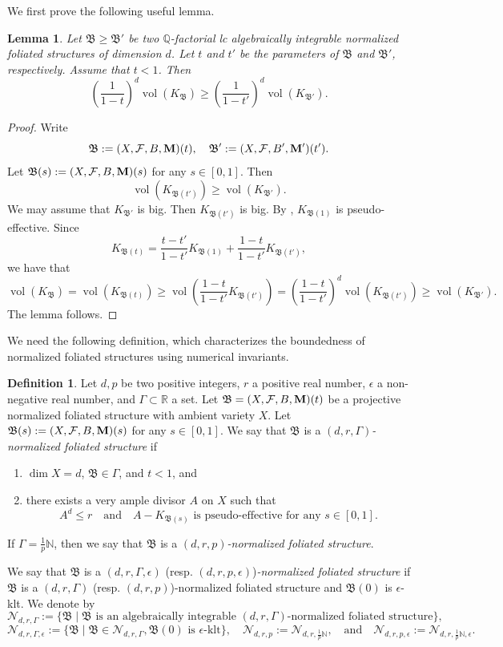 \documentclass[11pt,reqno]{amsart}
\numberwithin{equation}{section}
\newcommand{\Mm}{{\bf{M}}}
\newcommand{\vol}{\operatorname{vol}}
\newcommand{\Bb}{{\mathfrak{B}}}
\newcommand{\Ff}{\mathcal{F}}
\newcommand{\Ii}{\Gamma}
\newtheorem{lem}[thm]{Lemma}
\theoremstyle{definition}
\newtheorem{defn}[thm]{Definition}
\begin{document}
We first prove the following useful lemma.

\begin{lem}\label{lem: volume monotonicity}
    Let $\Bb\geq\Bb'$ be two $\mathbb Q$-factorial lc algebraically integrable normalized foliated structures of dimension $d$. Let $t$ and $t'$ be the parameters of $\Bb$ and $\Bb'$, respectively. Assume that $t<1$. Then 
    $$\left(\frac{1}{1-t}\right)^d\vol(K_{\Bb})\geq\left(\frac{1}{1-t'}\right)^d\vol(K_{\Bb'}).$$
\end{lem}
\begin{proof}
    Write 
    $$\Bb:=(X,\Ff,B,\Mm)(t),\quad \Bb':=(X,\Ff,B',\Mm')(t').$$
    Let $\Bb(s):=(X,\Ff,B,\Mm)(s)$ for any $s\in [0,1]$. Then
    $$\vol(K_{\Bb(t')})\geq\vol(K_{\Bb'}).$$
    We may assume that $K_{\Bb'}$ is big. Then $K_{\Bb(t')}$ is big. By \cite[Theorem~5.1]{Cas+25a}, $K_{\Bb(1)}$ is pseudo-effective. Since
    $$K_{\Bb(t)}=\frac{t-t'}{1-t'}K_{\Bb(1)}+\frac{1-t}{1-t'}K_{\Bb(t')},$$
    we have that
    $$\vol(K_{\Bb})=\vol(K_{\Bb(t)})\geq\vol\left(\frac{1-t}{1-t'}K_{\Bb(t')}\right)=\left(\frac{1-t}{1-t'}\right)^d\vol(K_{\Bb(t')})\geq\vol(K_{\Bb'}).$$
    The lemma follows.
\end{proof}

We need the following definition, which characterizes the boundedness of normalized foliated structures using numerical invariants.

\begin{defn}
Let $d,p$ be two positive integers, $r$ a positive real number, $\epsilon$ a non-negative real number, and $\Ii\subset\mathbb R$ a set. Let $\Bb=(X,\Ff,B,\Mm)(t)$ be a projective normalized foliated structure with ambient variety $X$. Let $\Bb(s):=(X,\Ff,B,\Mm)(s)$ for any $s\in [0,1]$. We say that $\Bb$ is a \emph{$(d,r,\Ii)$-normalized foliated structure} if
\begin{enumerate}
    \item $\dim X=d$, $\Bb\in\Ii$, and $t<1$, and
    \item there exists a very ample divisor $A$ on $X$ such that $$A^d\leq r \quad \text{and} \quad A-K_{\Bb(s)} \text{ is pseudo-effective for any }s\in [0,1].$$
\end{enumerate}
If $\Ii=\frac{1}{p}\mathbb N$, then we say that $\Bb$ is a \emph{$(d,r,p)$-normalized foliated structure}. 

We say that $\Bb$ is a \emph{$(d,r,\Ii,\epsilon)$} (resp. \emph{$(d,r,p,\epsilon)$})\emph{-normalized foliated structure} if $\Bb$ is a $(d,r,\Ii)$ (resp. $(d,r,p)$)-normalized foliated structure and $\Bb(0)$ is $\epsilon$-klt. We denote by 
$$\mathcal{N}_{d,r,\Ii}:=\{\Bb\mid \Bb\text{ is an algebraically integrable }(d,r,\Ii)\text{-normalized foliated structure}\},$$
$$\mathcal{N}_{d,r,\Ii,\epsilon}:=\{\Bb\mid \Bb\in\mathcal{N}_{d,r,\Ii},\Bb(0)\text{ is }\epsilon\text{-klt}\},\quad \mathcal{N}_{d,r,p}:=\mathcal{N}_{d,r,\frac{1}{p}\mathbb N},\quad \text{and}\quad \mathcal{N}_{d,r,p,\epsilon}:=\mathcal{N}_{d,r,\frac{1}{p}\mathbb N,\epsilon}.$$
\end{defn}
\end{document}
